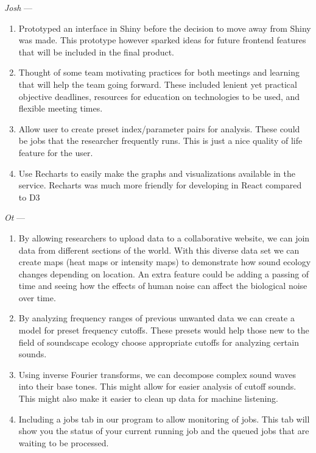 \textit{Josh} ---
\begin{enumerate}
    \item Prototyped an interface in Shiny before the decision to move away from Shiny was made. This prototype however sparked ideas for future frontend features that will be included in the final product.
    \item Thought of some team motivating practices for both meetings and learning that will help the team going forward. These included lenient yet practical objective deadlines, resources for education on technologies to be used, and flexible meeting times.
    \item Allow user to create preset index/parameter pairs for analysis. These could be jobs that the researcher frequently runs. This is just a nice quality of life feature for the user.
    \item Use Recharts to easily make the graphs and visualizations available in the service. Recharts was much more friendly for developing in React compared to D3
\end{enumerate}
\newpage
\textit{Ot} ---
\begin{enumerate}
    \item By allowing researchers to upload data to a collaborative website, we can join data from different sections of the world. With this diverse data set we can create maps (heat maps or intensity maps) to demonstrate how sound ecology changes depending on location. An extra feature could be adding a passing of time and seeing how the effects of human noise can affect the biological noise over time.
    \item By analyzing frequency ranges of previous unwanted data we can create a model for preset frequency cutoffs. These presets would help those new to the field of soundscape ecology choose appropriate cutoffs for analyzing certain sounds.
    \item Using inverse Fourier transforms, we can decompose complex sound waves into their base tones. This might allow for easier analysis of cutoff sounds. This might also make it easier to clean up data for machine listening.
    \item Including a jobs tab in our program to allow monitoring of jobs. This tab will show you the status of your current running job and the queued jobs that are waiting to be processed.
\end{enumerate}
